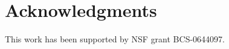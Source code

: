 \documentclass[11pt]{article}
\begin{document}





\section*{Acknowledgments}

This work has been supported by NSF grant BCS-0644097.  




\end{document}
